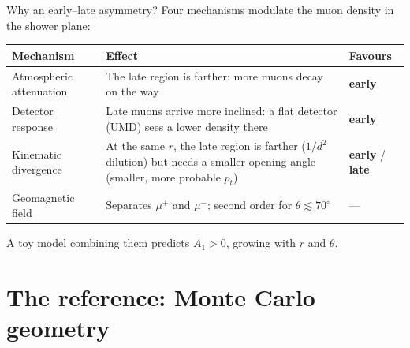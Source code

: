 \documentclass[aspectratio=169,11pt]{beamer}
\begin{document}
\begin{frame}{Why an early--late asymmetry?}
  \small
  Four mechanisms modulate the muon density in the shower plane:
  \vspace{0.4em}
  \begin{center}
    \renewcommand{\arraystretch}{1.35}
    \begin{tabular}{p{3.3cm}p{7.6cm}l}
      \toprule
      \textbf{Mechanism} & \textbf{Effect} & \textbf{Favours}\\
      \midrule
      Atmospheric attenuation & The late region is farther: more muons decay on the way &
        \textcolor{plotBlue}{\textbf{early}}\\
      Detector response & Late muons arrive more inclined: a flat detector (UMD) sees a lower
        density there & \textcolor{plotBlue}{\textbf{early}}\\
      Kinematic divergence & At the same $r$, the late region is farther ($1/d^2$ dilution) but
        needs a smaller opening angle (smaller, more probable $p_t$) &
        \textcolor{plotBlue}{\textbf{early}} / \textcolor{plotMaroon}{\textbf{late}}\\
      Geomagnetic field & Separates $\mu^+$ and $\mu^-$; second order for $\theta\lesssim70^\circ$ &
        ---\\
      \bottomrule
    \end{tabular}
  \end{center}
  \vspace{0.3em}
  \centering A toy model combining them predicts \alert{$A_1>0$, growing with $r$ and $\theta$}.
\end{frame}

\section{The reference: Monte Carlo geometry}
\end{document}
